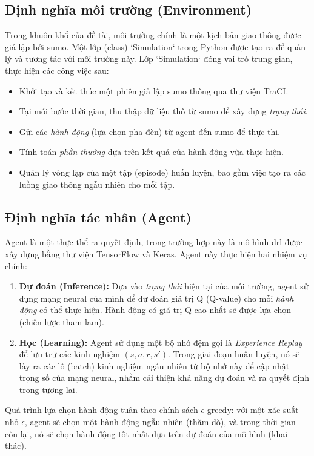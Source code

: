 \subsection{Định nghĩa môi trường (Environment)}
Trong khuôn khổ của đề tài, môi trường chính là một kịch bản giao thông được giả lập bởi \ac{sumo}. Một lớp (class) `Simulation` trong Python được tạo ra để quản lý và tương tác với môi trường này. Lớp `Simulation` đóng vai trò trung gian, thực
hiện các công việc sau:
\begin{itemize}
    \item Khởi tạo và kết thúc một phiên giả lập \ac{sumo} thông qua thư viện
        TraCI.

    \item Tại mỗi bước thời gian, thu thập dữ liệu thô từ \ac{sumo} để xây dựng \textit{trạng
        thái}.

    \item Gửi các \textit{hành động} (lựa chọn pha đèn) từ agent đến \ac{sumo} để
        thực thi.

    \item Tính toán \textit{phần thưởng} dựa trên kết quả của hành động vừa thực
        hiện.

    \item Quản lý vòng lặp của một tập (episode) huấn luyện, bao gồm việc tạo ra
        các luồng giao thông ngẫu nhiên cho mỗi tập.
\end{itemize}

\subsection{Định nghĩa tác nhân (Agent)}
Agent là một thực thể ra quyết định, trong trường hợp này là mô hình \ac{drl} được
xây dựng bằng thư viện TensorFlow và Keras. Agent này thực hiện hai nhiệm vụ
chính:
\begin{enumerate}
    \item \textbf{Dự đoán (Inference):} Dựa vào \textit{trạng thái} hiện tại của
        môi trường, agent sử dụng mạng neural của mình để dự đoán giá trị Q (Q-value)
        cho mỗi \textit{hành động} có thể thực hiện. Hành động có giá trị Q cao
        nhất sẽ được lựa chọn (chiến lược tham lam).

    \item \textbf{Học (Learning):} Agent sử dụng một bộ nhớ đệm gọi là \textit{Experience
        Replay} để lưu trữ các kinh nghiệm $(s, a, r, s')$. Trong giai đoạn huấn
        luyện, nó sẽ lấy ra các lô (batch) kinh nghiệm ngẫu nhiên từ bộ nhớ này để
        cập nhật trọng số của mạng neural, nhằm cải thiện khả năng dự đoán và ra
        quyết định trong tương lai.
\end{enumerate}
Quá trình lựa chọn hành động tuân theo chính sách $\epsilon$-greedy: với một xác
suất nhỏ $\epsilon$, agent sẽ chọn một hành động ngẫu nhiên (thăm dò), và trong
thời gian còn lại, nó sẽ chọn hành động tốt nhất dựa trên dự đoán của mô hình (khai
thác).

